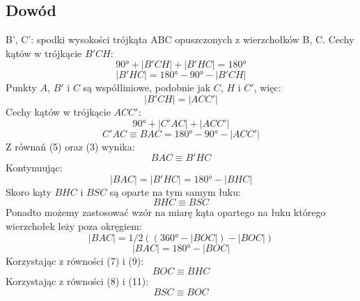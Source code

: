 \documentclass[12pt]{article}
\begin{document}
\begin{justify}
\section*{Dowód}
B', C': spodki wysokości trójkąta ABC opuszczonych z wierzchołków B, C. \linebreak
Cechy kątów w trójkącie $B'CH$:
\begin{equation}\ang{90} + |B'CH| + |B'HC| = \ang{180}\end{equation}
\begin{equation} |B'HC| = \ang{180} - \ang{90} - |B'CH| \end{equation}
Punkty $A$, $B'$ i $C$ są współliniowe, podobnie jak $C$, $H$ i $C'$, więc:
\begin{equation}|B'CH| = |ACC'|\end{equation}
Cechy kątów w trójkącie $ACC'$:
\begin{equation}\ang{90} + |C'AC| + |ACC'|\end{equation}
\begin{equation}C'AC \equiv BAC = \ang{180} - \ang{90} - |ACC'|\end{equation}
Z równań (5) oraz (3) wynika:
\begin{equation}BAC \equiv B'HC\end{equation}
Kontynuując:
\begin{equation}|BAC| = |B'HC| = \ang{180} - |BHC|\end{equation}
Skoro kąty $BHC$ i $BSC$ są oparte na tym samym łuku:
\begin{equation}BHC \equiv BSC\end{equation}
Ponadto możemy zastosować wzór na miarę kąta opartego na łuku którego wierzchołek leży poza okręgiem:
\begin{equation}|BAC| = 1/2((\ang{360} - |BOC|) - |BOC|)\end{equation}
\begin{equation}|BAC| = \ang{180} - |BOC|\end{equation}
Korzystając z równości (7) i (9):
\begin{equation}BOC \equiv BHC\end{equation}
Korzystając z równości (8) i (11):
\begin{equation}BSC \equiv BOC\end{equation}


\end{justify}
\end{document}
